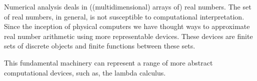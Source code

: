 Numerical analysis deals in ((multidimensional) arrays of) real numbers. The
set of real numbers, in general, is not susceptible to computational
interpretation\cite{turing-1936-7-computability}. Since the inception of
physical computers we have thought ways to approximate real number arithmetic
using more representable devices. These devices are finite sets of discrete
objects and finite functions between these sets.

This fundamental machinery can represent a range of more abstract computational
devices, such as, the lambda calculus.


